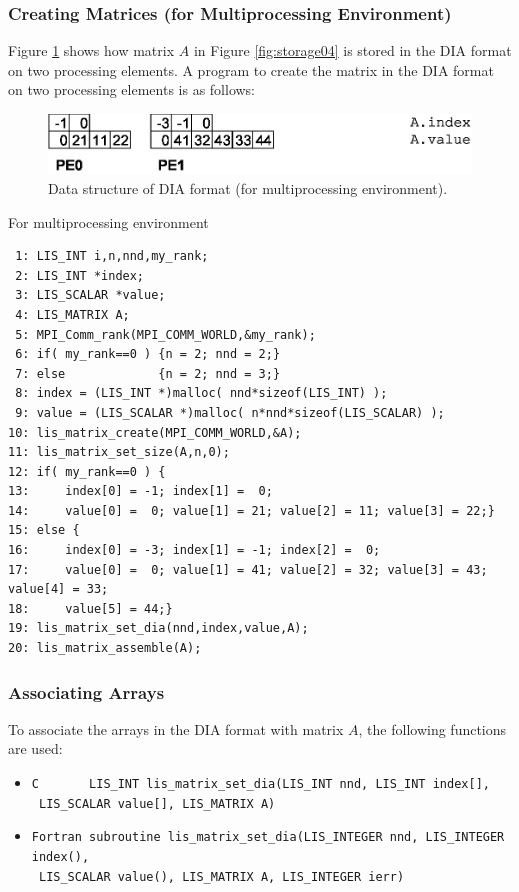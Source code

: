 \documentclass[a4paper]{article}
\begin{document}
\subsubsection{Creating Matrices (for Multiprocessing Environment)}
Figure \ref{fig:storage04_mpi} shows how matrix $A$ in Figure \ref{fig:storage04} is stored in the DIA format on two processing elements. A program to create the matrix in the DIA format on two processing elements is as follows:
\begin{figure}[h]
{\centering 
\includegraphics{storage04_mpi.eps} 
\caption{Data structure of DIA format (for multiprocessing environment).}\label{fig:storage04_mpi}}
\end{figure}
\begin{itemsquarebox}[l]{For multiprocessing environment}
\small
\begin{verbatim}
 1: LIS_INT i,n,nnd,my_rank;
 2: LIS_INT *index;
 3: LIS_SCALAR *value;
 4: LIS_MATRIX A;
 5: MPI_Comm_rank(MPI_COMM_WORLD,&my_rank);
 6: if( my_rank==0 ) {n = 2; nnd = 2;}
 7: else             {n = 2; nnd = 3;}
 8: index = (LIS_INT *)malloc( nnd*sizeof(LIS_INT) );
 9: value = (LIS_SCALAR *)malloc( n*nnd*sizeof(LIS_SCALAR) );
10: lis_matrix_create(MPI_COMM_WORLD,&A);
11: lis_matrix_set_size(A,n,0);
12: if( my_rank==0 ) {
13:     index[0] = -1; index[1] =  0;
14:     value[0] =  0; value[1] = 21; value[2] = 11; value[3] = 22;}
15: else {
16:     index[0] = -3; index[1] = -1; index[2] =  0;
17:     value[0] =  0; value[1] = 41; value[2] = 32; value[3] = 43; value[4] = 33;
18:     value[5] = 44;}
19: lis_matrix_set_dia(nnd,index,value,A);
20: lis_matrix_assemble(A);
\end{verbatim}
\end{itemsquarebox}

\subsubsection{Associating Arrays}
To associate the arrays in the DIA format with matrix $A$, the following functions are used:
\begin{itemize}
\item \verb|C       LIS_INT lis_matrix_set_dia(LIS_INT nnd, LIS_INT index[],|\\
      \verb| LIS_SCALAR value[], LIS_MATRIX A)|
\item \verb|Fortran subroutine lis_matrix_set_dia(LIS_INTEGER nnd, LIS_INTEGER index(),|\\
      \verb| LIS_SCALAR value(), LIS_MATRIX A, LIS_INTEGER ierr)|
\end{itemize}
\end{document}
